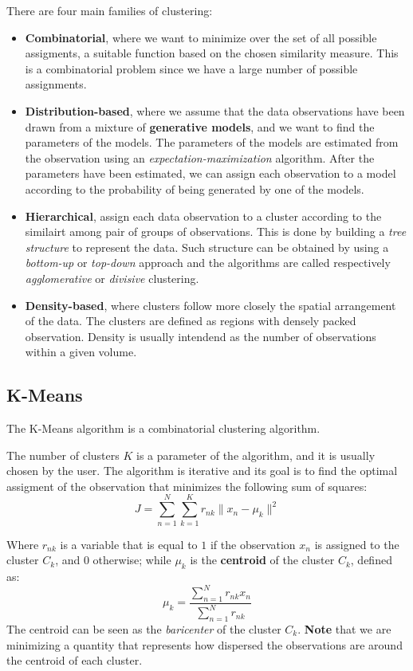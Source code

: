 There are four main families of clustering:
\begin{itemize}
    \item \textbf{Combinatorial}, where we want to minimize over the set of all possible assigments, a suitable function based on the chosen similarity measure. This is a combinatorial problem since we have a large number of possible assignments.
    \item \textbf{Distribution-based}, where we assume that the data observations have been drawn from a mixture of \textbf{generative models}, and we want to find the parameters of the models. The parameters of the models are estimated from the observation using an \textit{expectation-maximization} algorithm. After the parameters have been estimated, we can assign each observation to a model according to the probability of being generated by one of the models.
    \item \textbf{Hierarchical}, assign each data observation to a cluster according to the similairt among pair of groups of observations. This is done by building a \textit{tree structure} to represent the data. Such structure can be obtained by using a \textit{bottom-up} or \textit{top-down} approach and the algorithms are called respectively \textit{agglomerative} or \textit{divisive} clustering.
    \item \textbf{Density-based}, where clusters follow more closely the spatial arrangement of the data. The clusters are defined as regions with densely packed observation. Density is usually intendend as the number of observations within a given volume.
\end{itemize}

\subsection*{K-Means}
The K-Means algorithm is a combinatorial clustering algorithm.

The number of clusters $K$ is a parameter of the algorithm, and it is usually chosen by the user. The algorithm is iterative and its goal is to find the optimal assigment of the observation that minimizes the following sum of squares:
\[
    J = \sum_{n=1}^{N} \sum_{k=1}^K r_{nk} \|x_n - \mu_k\|^2
\]

Where $r_{nk}$ is a variable that is equal to $1$ if the observation $x_n$ is assigned to the cluster $C_k$, and $0$ otherwise; while $\mu_k$ is the \textbf{centroid} of the cluster $C_k$, defined as:
\[
    \mu_k = \frac{\sum_{n=1}^{N} r_{nk} x_n}{\sum_{n=1}^{N} r_{nk}}
\]
The centroid can be seen as the \textit{baricenter} of the cluster $C_k$. \textbf{Note} that we are minimizing a quantity that represents how dispersed the observations are around the centroid of each cluster.

